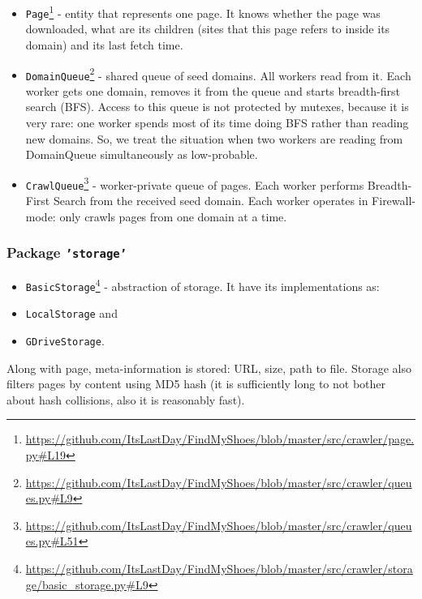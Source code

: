 \documentclass[format=sigconf]{acmart}
\begin{document}
    \begin{itemize}
    \item \texttt{Page}\footnote{\url{https://github.com/ItsLastDay/FindMyShoes/blob/master/src/crawler/page.py\#L19}} - entity that represents one page. It knows whether the page was downloaded, what are its children (sites that this page refers to inside its domain) and its last fetch time.
    
    \item \texttt{DomainQueue}\footnote{\url{https://github.com/ItsLastDay/FindMyShoes/blob/master/src/crawler/queues.py\#L9}} - shared queue of seed domains. All workers read from it. Each worker gets one domain, removes it from the queue and starts breadth-first search (BFS). 
    Access to this queue is not protected by mutexes, because it is very rare: one worker spends most of its time doing BFS rather than reading new domains. So, we treat the situation when two workers are reading from DomainQueue simultaneously as low-probable.
    
    \item \texttt{CrawlQueue}\footnote{\url{https://github.com/ItsLastDay/FindMyShoes/blob/master/src/crawler/queues.py\#L51}} - worker-private queue of pages. Each worker performs Breadth-First Search from the received seed domain. Each worker operates in Firewall-mode: only crawls pages from one domain at a time.
    \end{itemize}
    
    \subsubsection{Package \texttt{'storage'}}
    \begin{itemize}
    \item \texttt{BasicStorage}\footnote{\url{https://github.com/ItsLastDay/FindMyShoes/blob/master/src/crawler/storage/basic_storage.py\#L9}} - abstraction of storage. It have its implementations as:
    \item \texttt{LocalStorage} and
    \item \texttt{GDriveStorage}.
    \end{itemize}
    
    Along with page, meta-information is stored: URL, size, path to file. Storage also filters pages by content using MD5 hash (it is sufficiently long to not bother about hash collisions, also it is reasonably fast).
    
\end{document}
